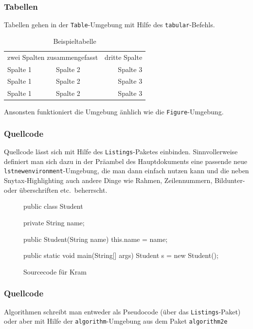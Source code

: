     \subsubsection{Tabellen}
        Tabellen gehen in der \texttt{Table}-Umgebung mit Hilfe des \texttt{tabular}-Befehls.
        \begin{table}
            \centering
            \begin{tabular}{l|l||r}
                \multicolumn{2}{l}{zwei Spalten zusammengefasst} & dritte Spalte\\
                Spalte 1 & Spalte 2 & Spalte 3 \\\hline\hline
                Spalte 1 & Spalte 2 & Spalte 3 \\\hline
                Spalte 1 & Spalte 2 & Spalte 3 \\\hline
            \end{tabular}
            \caption{Beispieltabelle}
            \label{tab:beispieltabelle}
        \end{table}
        
        Ansonsten funktioniert die Umgebung änhlich wie die
        \texttt{Figure}-Umgebung.
    
    
    \subsubsection{Quellcode}
        Quellcode lässt sich mit Hilfe des \texttt{Listings}-Paketes einbinden.
        Sinnvollerweise definiert man sich dazu in der Präambel des
        Hauptdokuments eine passende neue \texttt{lstnewenvironment}-Umgebung, die man
        dann einfach nutzen kann und die neben Snytax-Highlighting auch andere
        Dinge wie Rahmen, Zeilennummern, Bildunter- oder überschriften
        etc.~beherrscht.
        
        \begin{figure}
        \centering
        \begin{java}
public class Student {
    private String name;

    public Student(String name) {
        this.name = name; 
    }
    
    public static void main(String[] args) {
        Student s = new Student();
    }
}
        \end{java}
        \caption{Sourcecode für Kram}
        \label{fig:source}
        \end{figure}
        
        
     \subsubsection{Quellcode}
        Algorithmen schreibt man entweder als Pseudocode (über das
        \texttt{Listings}-Paket) oder aber mit Hilfe der \texttt{algorithm}-Umgebung aus
        dem Paket \texttt{algorithm2e}
        
